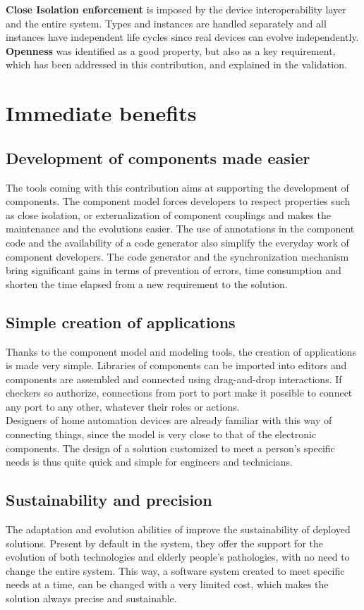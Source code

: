 {\bf Close Isolation enforcement} is imposed by the device interoperability layer and the entire \enti{} system. Types and instances are handled separately and all instances have independent life cycles since real devices can evolve independently.\\

{\bf Openness} was identified as a good property, but also as a key requirement, which has been addressed in this contribution, and explained in the validation.


\section{Immediate benefits}

\subsection{Development of components made easier}
The tools coming with this contribution aims at supporting the development of components. The component model forces developers to respect properties such as close isolation, or externalization of component couplings and makes the maintenance and the evolutions easier. The use of annotations in the component code and the availability of a code generator also simplify the everyday work of component developers. The code generator and the synchronization mechanism bring significant gains in terms of prevention of errors, time consumption and shorten the time elapsed from a new requirement to the solution.

\subsection{Simple creation of applications}
Thanks to the component model and modeling tools, the creation of applications is made very simple. Libraries of components can be imported into editors and components are assembled and connected using drag-and-drop interactions. If checkers so authorize, connections from port to port make it possible to connect any port to any other, whatever their roles or actions.\\
Designers of home automation devices are already familiar with this way of connecting things, since the model is very close to that of the electronic components. The design of a solution customized to meet a person's specific needs is thus quite quick and simple for engineers and technicians.

\subsection{Sustainability and precision}
The adaptation and evolution abilities of \enti{} improve the sustainability of deployed solutions. Present by default in the system, they offer the support for the evolution of both technologies and elderly people's pathologies, with no need to change the entire system. This way, a software system created to meet specific needs at a time, can be changed with a very limited cost, which makes the solution always precise and sustainable.

